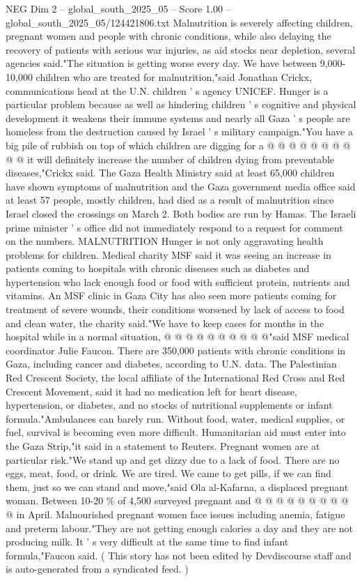 \begin{textsample}{NEG Dim 2 – global\_south\_2025\_05 – Score 1.00 – global\_south\_2025\_05/124421806.txt}
Malnutrition is severely affecting children, pregnant women and people with chronic conditions, while also delaying the recovery of patients with serious war injuries, as aid stocks near depletion, several agencies said."The situation is getting worse every day.
We have between 9,000-10,000 children who are treated for malnutrition,"said Jonathan Crickx, communications head at the U.N. children ' s agency UNICEF.
Hunger is a particular problem because as well as hindering children ' s cognitive and physical development it weakens their immune systems and nearly all Gaza ' s people are homeless from the destruction caused by Israel ' s military campaign."You have a big pile of rubbish on top of which children are digging for a @ @ @ @ @ @ @ @ @ @ it will definitely increase the number of children dying from preventable diseases,"Crickx said.
The Gaza Health Ministry said at least 65,000 children have shown symptoms of malnutrition and the Gaza government media office said at least 57 people, mostly children, had died as a result of malnutrition since Israel closed the crossings on March 2.
Both bodies are run by Hamas.
The Israeli prime minister ' s office did not immediately respond to a request for comment on the numbers.
MALNUTRITION Hunger is not only aggravating health problems for children.
Medical charity MSF said it was seeing an increase in patients coming to hospitals with chronic diseases such as diabetes and hypertension who lack enough food or food with sufficient protein, nutrients and vitamins.
An MSF clinic in Gaza City has also seen more patients coming for treatment of severe wounds, their conditions worsened by lack of access to food and clean water, the charity said."We have to keep cases for months in the hospital while in a normal situation, @ @ @ @ @ @ @ @ @ @"said MSF medical coordinator Julie Faucon.
There are 350,000 patients with chronic conditions in Gaza, including cancer and diabetes, according to U.N. data.
The Palestinian Red Crescent Society, the local affiliate of the International Red Cross and Red Crescent Movement, said it had no medication left for heart disease, hypertension, or diabetes, and no stocks of nutritional supplements or infant formula."Ambulances can barely run.
Without food, water, medical supplies, or fuel, survival is becoming even more difficult.
Humanitarian aid must enter into the Gaza Strip,"it said in a statement to Reuters.
Pregnant women are at particular risk."We stand up and get dizzy due to a lack of food.
There are no eggs, meat, food, or drink.
We are tired.
We came to get pills, if we can find them, just so we can stand and move,"said Ola al-Kafarna, a displaced pregnant woman.
Between 10-20 \% of 4,500 surveyed pregnant and @ @ @ @ @ @ @ @ @ @ in April.
Malnourished pregnant women face issues including anemia, fatigue and preterm labour."They are not getting enough calories a day and they are not producing milk.
It ' s very difficult at the same time to find infant formula,"Faucon said. ( This story has not been edited by Devdiscourse staff and is auto-generated from a syndicated feed. )

\end{textsample}
